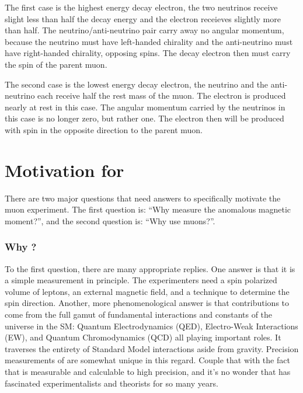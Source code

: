 The first case is the highest energy decay electron, the two neutrinos receive slight less than half the decay energy and the electron receieves slightly more than half.  The neutrino/anti-neutrino pair carry away no angular momentum, because the neutrino must have left-handed chirality and the anti-neutrino must have right-handed chirality, opposing spins.  The decay electron then must carry the spin of the parent muon.

The second case is the lowest energy decay electron, the neutrino and the anti-neutrino each receive half the rest mass of the muon.  The electron is produced nearly at rest in this case.  The angular momentum carried by the neutrinos in this case is no longer zero, but rather one.  The electron then will be produced with spin in the opposite direction to the parent muon.

\section{Motivation for \mugmtwo}
There are two major questions that need answers to specifically motivate the muon \gmtwo experiment.  The first question is: ``Why measure the anomalous magnetic moment?'', and the second question is: ``Why use muons?''.

\subsubsection{Why \gmtwo?}
To the first question, there are many appropriate replies.  One answer is that it is a simple measurement in principle.  The experimenters need a spin polarized volume of leptons, an external magnetic field, and a technique to determine the spin direction. Another, more phenomenological answer is that contributions to \gmtwo come from the full gamut of fundamental interactions and constants of the universe in the SM: Quantum Electrodynamics (QED), Electro-Weak Interactions (EW), and Quantum Chromodynamics (QCD) all playing important roles. It traverses the entirety of Standard Model interactions aside from gravity. Precision measurements of \gmtwo are somewhat unique in this regard.  Couple that with the fact that \gmtwo is measurable and calculable to high precision, and it's no wonder that \gmtwo  has fascinated experimentalists and theorists for so many years.

